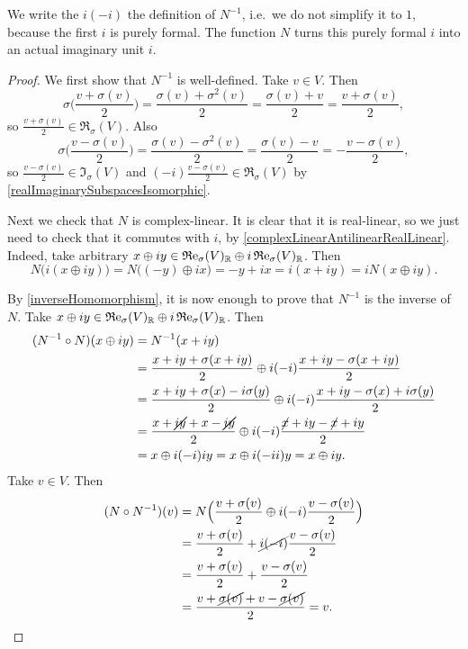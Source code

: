 We write the $i(-i)$ the definition of $N^{-1}$, i.e.\ we do not simplify it to $1$, because the first $i$ is purely formal. The function $N$ turns this purely formal $i$ into an actual imaginary unit $i$.
\begin{proof}
We first show that $N^{-1}$ is well-defined. Take $v\in V$. Then
\[ \sigma\Big(\frac{v+\sigma(v)}{2}\Big) = \frac{\sigma(v)+\sigma^2(v)}{2} = \frac{\sigma(v)+v}{2} = \frac{v+\sigma(v)}{2}, \]
so $\frac{v+\sigma(v)}{2}\in \Re_\sigma(V)$. Also
\[ \sigma\Big(\frac{v-\sigma(v)}{2}\Big) = \frac{\sigma(v)-\sigma^2(v)}{2} = \frac{\sigma(v)-v}{2} = - \frac{v-\sigma(v)}{2}, \]
so $\frac{v-\sigma(v)}{2}\in \Im_\sigma(V)$ and $(-i)\frac{v-\sigma(v)}{2} \in \Re_\sigma(V)$ by \ref{realImaginarySubspacesIsomorphic}.

Next we check that $N$ is complex-linear. It is clear that it is real-linear, so we just need to check that it commutes with $i$, by \ref{complexLinearAntilinearRealLinear}. Indeed, take arbitrary $x\oplus iy\in \operatorname{\mathfrak{R}e}_\sigma(V)_{\mathbb{R}}\oplus i \operatorname{\mathfrak{R}e}_\sigma(V)_{\mathbb{R}}$. Then
\[ N\big(i(x\oplus iy)\big) = N\big((-y)\oplus ix\big) = -y+ix = i(x+iy) = iN(x\oplus iy). \]

By \ref{inverseHomomorphism}, it is now enough to prove that $N^{-1}$ is the inverse of $N$. Take $x\oplus iy \in \operatorname{\mathfrak{R}e}_\sigma(V)_{\mathbb{R}}\oplus i \operatorname{\mathfrak{R}e}_\sigma(V)_{\mathbb{R}}$. Then
\begin{align*}
(N^{-1}\circ N)(x\oplus iy) &= N^{-1}(x+iy) \\
&= \frac{x+iy + \sigma(x+iy)}{2}\oplus i(-i)\frac{x+iy - \sigma(x+iy)}{2} \\
&= \frac{x+iy + \sigma(x)-i\sigma(y)}{2}\oplus i(-i)\frac{x+iy - \sigma(x)+i\sigma(y)}{2} \\
&= \frac{x+\cancel{iy} + x-\cancel{iy}}{2}\oplus i(-i)\frac{\cancel{x}+iy - \cancel{x}+iy}{2} \\
&= x\oplus i(-i)iy = x\oplus i(-ii)y = x\oplus iy.
\end{align*}
Take $v\in V$. Then
\begin{align*}
(N\circ N^{-1})(v) &= N\Big(\frac{v+\sigma(v)}{2} \oplus i(-i)\frac{v-\sigma(v)}{2}\Big) \\
&= \frac{v+\sigma(v)}{2} + \cancel{i(-i)}\frac{v-\sigma(v)}{2} \\
&= \frac{v+\sigma(v)}{2} + \frac{v-\sigma(v)}{2} \\
&= \frac{v+\cancel{\sigma(v)}+ v - \cancel{\sigma(v)}}{2} = v.
\end{align*}
\end{proof}

